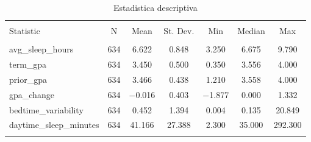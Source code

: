 
\begin{table}[H] \centering 
  \caption{Estadistica descriptiva} 
  \label{tab:estadistica_1b} 
\small 
\begin{tabular}{@{\extracolsep{5pt}}lcccccc} 
\\[-1.8ex]\hline 
\hline \\[-1.8ex] 
Statistic & \multicolumn{1}{c}{N} & \multicolumn{1}{c}{Mean} & \multicolumn{1}{c}{St. Dev.} & \multicolumn{1}{c}{Min} & \multicolumn{1}{c}{Median} & \multicolumn{1}{c}{Max} \\ 
\hline \\[-1.8ex] 
avg\_sleep\_hours & 634 & 6.622 & 0.848 & 3.250 & 6.675 & 9.790 \\ 
term\_gpa & 634 & 3.450 & 0.500 & 0.350 & 3.556 & 4.000 \\ 
prior\_gpa & 634 & 3.466 & 0.438 & 1.210 & 3.558 & 4.000 \\ 
gpa\_change & 634 & $-$0.016 & 0.403 & $-$1.877 & 0.000 & 1.332 \\ 
bedtime\_variability & 634 & 0.452 & 1.394 & 0.004 & 0.135 & 20.849 \\ 
daytime\_sleep\_minutes & 634 & 41.166 & 27.388 & 2.300 & 35.000 & 292.300 \\ 
\hline \\[-1.8ex] 
\end{tabular} 
\end{table} 
